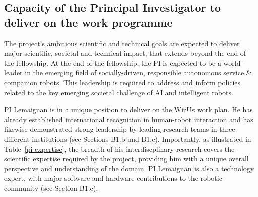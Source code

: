 \documentclass[11pt,a4paper]{report}
\newcommand{\project}{WizUs\xspace}
\begin{document}
\subsection{Capacity of the Principal Investigator to deliver on the work programme}

The project's ambitious scientific and technical goals are expected to deliver
major scientific, societal and technical impact, that extends beyond the end of
the fellowship. At the end of the fellowship, the PI is expected to be a
world-leader in the emerging field of socially-driven, responsible autonomous
service \& companion robots. This leadership is required to address and inform
policies related to the key emerging societal challenge of AI and intelligent
robots.

PI Lemaignan is in a unique position to deliver on the \project work plan.  He
has already established international recognition in human-robot interaction and
has likewise demonstrated strong leadership by leading research teams in three
different institutions (see Sections B1.b and B1.c). Importantly, as
illustrated in Table~\ref{pi-expertise}, the breadth of
his interdiscplinary research covers the scientific expertise required by the
project, providing him with a unique overall perspective and understanding of
the domain. PI Lemaignan is also a technology expert, with major software and
hardware contributions to the robotic community (see Section B1.c).
\end{document}
